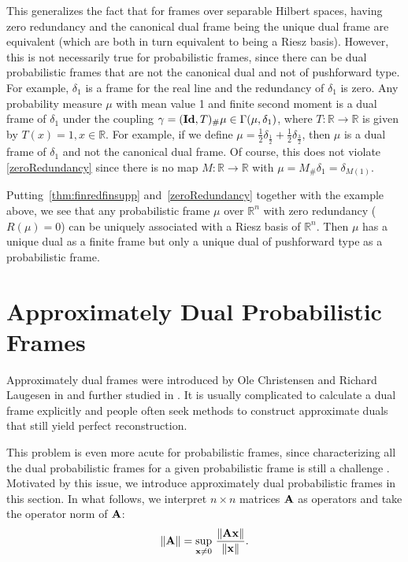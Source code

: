 \documentclass{amsart}
\numberwithin{equation}{section}
\newcommand{\bR}{\mathbb R}
\newcommand{\bI}{{\bf Id}}
\theoremstyle{plain}
\theoremstyle{remark}
\theoremstyle{definition}
\begin{document}
This generalizes the fact that for frames over separable Hilbert spaces, having zero redundancy and the canonical dual frame being the unique dual frame are equivalent (which are both in turn equivalent to being a Riesz basis). However, this is not necessarily true for probabilistic frames, since there can be dual probabilistic frames that are not the canonical dual and not of pushforward type. For example, $\delta_1$ is a frame for the real line and the redundancy of $\delta_1$ is zero. Any probability measure $\mu$ with mean value 1 and finite second moment is a dual frame of $\delta_1$ under the coupling $\gamma = (\bI, T)_\#\mu \in \Gamma(\mu, \delta_1)$, where $T:\mathbb{R} \rightarrow \mathbb{R}$ is given by $T(x) = 1, x \in \mathbb{R}$. For example, if we define $\mu = \frac{1}{2}\delta_{\frac{1}{2}} + \frac{1}{2}\delta_{\frac{3}{2}}$, then $\mu$ is a dual frame of $\delta_1$ and not the canonical dual frame. Of course, this does not violate \cref{zeroRedundancy} since there is no map $M: \mathbb{R} \rightarrow \mathbb{R}$ with $\mu = M_\# \delta_1 = \delta_{M(1)}$. 


Putting~\cref{thm:finredfinsupp} and~\cref{zeroRedundancy} together with the example above, we see that any probabilistic frame $\mu$ over $\bR^n$ with zero redundancy ($R(\mu) = 0$) can be uniquely associated with a Riesz basis of $\mathbb{R}^n$. Then $\mu$ has a unique dual as a finite frame but only a unique dual of pushforward type as a probabilistic frame.



\section{Approximately Dual Probabilistic Frames}\label{approximateDual}
Approximately dual frames were introduced by Ole Christensen and Richard Laugesen in \cite{christensen2010approximately} and further studied in \cite{javanshiri2016some}. It is usually complicated to calculate a dual frame explicitly and people often seek methods to construct approximate duals that still yield perfect reconstruction. 

This problem is even more acute for probabilistic frames, since characterizing all the dual probabilistic frames for a given probabilistic frame is still a challenge \cite{chen2024general}.  Motivated by this issue, we introduce approximately dual probabilistic frames in this section. In what follows, we interpret $n \times n$ matrices $\bf A$ as operators and take the operator norm of $\bf A$:
$$\|{\bf A} \| =  \underset{{\bf x} \neq 0}{\text{sup}}\ \frac{\|{\bf Ax}\|}{\|{\bf x}\|}.$$
\end{document}

